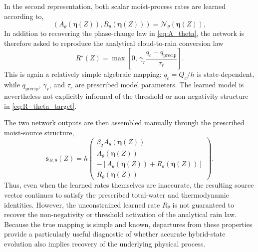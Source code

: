 \documentclass[12pt]{article}
\begin{document}
In the second representation, both scalar moist-process rates are learned
according to,
\begin{equation}
	\left(
	A_\theta(\boldsymbol{\eta}(Z)),
	R_\theta(\boldsymbol{\eta}(Z))
	\right)
	=
	\mathcal{N}_\theta\!\left(\boldsymbol{\eta}(Z)\right),
\end{equation}
In addition to recovering the phase-change law in
\eqref{eq:A_theta}, the network is therefore asked to reproduce the
analytical cloud-to-rain conversion law
\begin{equation}
	R^\star(Z)
	=
	\max\left[
	0,\,
	\gamma_r
	\frac{q_c-q_{\mathrm{precip}}}{\tau_r}
	\right].
	\label{eq:R_theta_target}
\end{equation}
This is again a relatively simple algebraic mapping: $q_c=Q_c/h$ is
state-dependent, while $q_{\mathrm{precip}}$, $\gamma_r$, and $\tau_r$
are prescribed model parameters. The learned model is nevertheless not
explicitly informed of the threshold or non-negativity structure in
\eqref{eq:R_theta_target}.

The two network outputs are then assembled manually through the prescribed
moist-source structure,
\begin{equation}
	\mathbf{s}_{B,\theta}(Z)
	=
	h
	\begin{pmatrix}
		\beta_2 A_\theta(\boldsymbol{\eta}(Z))\\
		A_\theta(\boldsymbol{\eta}(Z))\\
		-\left[
		A_\theta(\boldsymbol{\eta}(Z))
		+
		R_\theta(\boldsymbol{\eta}(Z))
		\right]\\
		R_\theta(\boldsymbol{\eta}(Z))
	\end{pmatrix}.
	\label{eq:representation_B}
\end{equation}
Thus, even when the learned rates themselves are inaccurate, the
resulting source vector continues to satisfy the prescribed total-water and
thermodynamic identities. However, the unconstrained learned rate
$R_\theta$ is not guaranteed to recover the non-negativity or threshold
activation of the analytical rain law. Because the true mapping is simple
and known, departures from these properties provide a particularly useful
diagnostic of whether accurate hybrid-state evolution also implies recovery
of the underlying physical process.
\end{document}
